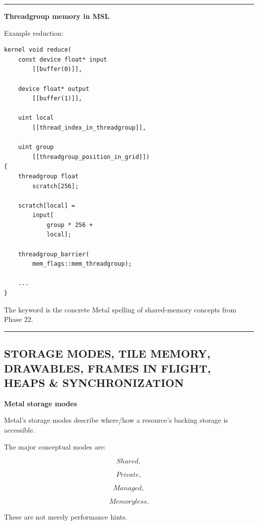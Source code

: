 \begin{center}\rule{0.5\linewidth}{0.5pt}\end{center}

\textbf{Threadgroup memory in MSL}

Example reduction:

\begin{verbatim}
kernel void reduce(
    const device float* input
        [[buffer(0)]],

    device float* output
        [[buffer(1)]],

    uint local
        [[thread_index_in_threadgroup]],

    uint group
        [[threadgroup_position_in_grid]])
{
    threadgroup float
        scratch[256];

    scratch[local] =
        input[
            group * 256 +
            local];

    threadgroup_barrier(
        mem_flags::mem_threadgroup);

    ...
}
\end{verbatim}

The keyword  is the concrete Metal spelling of shared-memory concepts from Phase 22.

\begin{center}\rule{0.5\linewidth}{0.5pt}\end{center}

\subsection{STORAGE MODES, TILE MEMORY, DRAWABLES, FRAMES IN FLIGHT, HEAPS \& SYNCHRONIZATION}\label{05-engine-i-ch023-storage-modes-tile-memory-drawables-frames-in-flight-heaps-synchronization}

\hypertarget{05-engine-i-ch023-storage-modes-tile-memory-drawables-frames-in-flight-heaps-synchronization}{}

\textbf{Metal storage modes}

Metal's storage modes describe where/how a resource's backing storage is accessible.

The major conceptual modes are:

\[
Shared,
\]

\[
Private,
\]

\[
Managed,
\]

\[
Memoryless.
\]

These are not merely performance hints.

